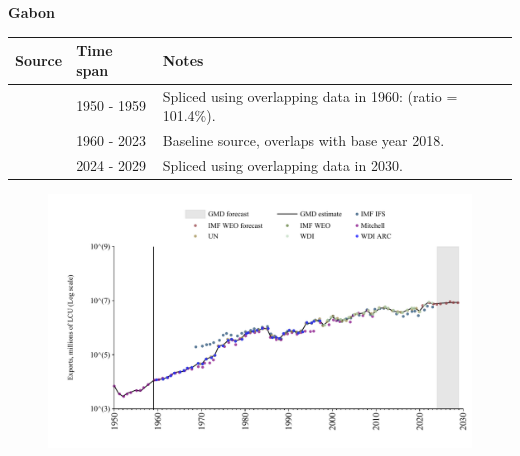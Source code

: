 \documentclass[12pt,a4paper,landscape]{article}
\begin{document}
\begin{adjustbox}{max totalsize={\paperwidth}{\paperheight},center}
\begin{minipage}[t][\textheight][t]{\textwidth}
\vspace*{0.5cm}
{}
\begin{center}
{\Large\bfseries Gabon}
\end{center}
\vspace{0.5cm}
\begin{table}[H]
\centering
\small
\begin{tabular}{|l|l|l|}
\hline
\textbf{Source} & \textbf{Time span} & \textbf{Notes} \\
\hline
\rowcolor{white}\cite{Mitchell}& 1950 - 1959 &Spliced using overlapping data in 1960: (ratio = 101.4\%).\\
\rowcolor{lightgray}\cite{WDI}& 1960 - 2023 &Baseline source, overlaps with base year 2018.\\
\rowcolor{white}\cite{IMF_WEO_forecast}& 2024 - 2029 &Spliced using overlapping data in 2030.\\
\hline
\end{tabular}
\end{table}
\begin{figure}[H]
\centering
\includegraphics[width=\textwidth,height=0.6\textheight,keepaspectratio]{graphs/GAB_exports.pdf}
\end{figure}
\end{minipage}
\end{adjustbox}
\end{document}
